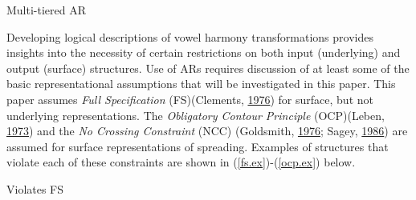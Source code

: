 \documentclass[,doc,floatsintext]{apa6}
\theoremstyle{definition}
\theoremstyle{definition}
\theoremstyle{definition}
\theoremstyle{remark}
\begin{document}
\begin{exe}
\ex Multi-tiered AR \label{ar.ex}\\
\end{exe}

Developing logical descriptions of vowel harmony transformations
provides insights into the necessity of certain restrictions on both
input (underlying) and output (surface) structures. Use of ARs requires
discussion of at least some of the basic representational assumptions
that will be investigated in this paper. This paper assumes \emph{Full
Specification} (FS)(Clements,
\protect\hyperlink{ref-Clements1976}{1976}) for surface, but not
underlying representations. The \emph{Obligatory Contour Principle}
(OCP)(Leben, \protect\hyperlink{ref-leben1973}{1973}) and the \emph{No
Crossing Constraint} (NCC) (Goldsmith,
\protect\hyperlink{ref-Goldsmith1976}{1976}; Sagey,
\protect\hyperlink{ref-sagey1986}{1986}) are assumed for surface
representations of spreading. Examples of structures that violate each
of these constraints are shown in (\ref{fs.ex})-(\ref{ocp.ex}) below.

\begin{exe}
\ex \label{fs.ex} Violates FS\\
\end{exe}
\end{document}
